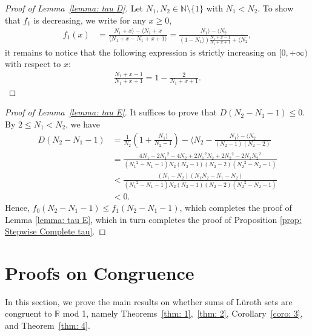 \documentclass{ws-ijnt}
\begin{document}
	
	\begin{proof}[Proof of Lemma~\ref{lemma: tau D}]
		Let $N_1,N_2\in\mathbb{N}\setminus\{1\}$ with $N_1<N_2$. To show that $f_1$ is decreasing, we write for any $x\geq 0$,
		\begin{align*}
			f_1(x)
			&=\frac{N_1+x\rangle-\langle N_1+x}{\langle N_1+x-N_1+x+1\rangle}
			=\frac{N_1\rangle-\langle N_2}{\displaystyle
				(1-N_1\rangle)\frac{N_1+x-1}{N_1+x+1}+\langle N_2}
			,
		\end{align*}
		it remains to notice that the following expression is strictly increasing on $[0,+\infty)$ with respect to $x$:
		\begin{align*}
			\frac{N_1+x-1}{N_1+x+1}=1-\frac{2}{{N_1+x+1}}.
		\end{align*}
	\end{proof}
	
	\begin{proof}[Proof of Lemma~\ref{lemma: tau E}]
		It suffices to prove that $D(N_2-N_1-1)\leq0$. By $2\leq N_1<N_2$, we have
		\begin{align*}
			D(N_2-N_1-1)
			&=\frac{1}{N_2}\left(1+\frac{N_1\rangle}{N_2-1}\right)-\langle N_2-\frac{N_1\rangle-\langle N_2}{(N_2-1)(N_2-2)} \\
			&=\frac{4N_1-2{N_1}^{2}-4N_2+2{N_1}^{2}N_2+2{N_2}^{2}-2N_1{N_2}^{2}}{({N_1}^2-{N_1}-1){N_2}({N_2}-1)({N_2}-2)({N_2}^2-{N_2}-1)} \\
			&<\frac{(N_1-N_2)(N_1N_2-N_1-N_2)}{({N_1}^2-{N_1}-1){N_2}({N_2}-1)({N_2}-2)({N_2}^2-{N_2}-1)} \\
			&<0
			.
		\end{align*}
		Hence, $f_0(N_2-N_1-1) \leq f_1(N_2-N_1-1)$, which completes the proof of Lemma \ref{lemma: tau E}, which in turn completes the proof of Proposition \ref{prop: Stepwise Complete tau}.
	\end{proof}
	
	\section{Proofs on Congruence}\label{sectproofs}
	In this section, we prove the main results on whether sums of L\"uroth sets are congruent to $\mathbb{R}$ mod 1, namely Theorems~\ref{thm: 1},~\ref{thm: 2}, Corollary~\ref{coro: 3}, and Theorem~\ref{thm: 4}.
	
\end{document}
